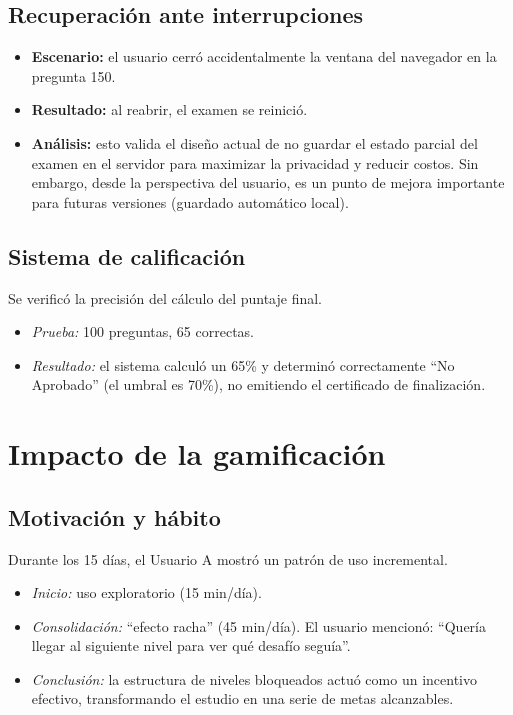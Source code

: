 \subsection{Recuperación ante interrupciones}
\begin{itemize}
\item   \textbf{Escenario:} el usuario cerró accidentalmente la ventana del navegador en la pregunta 150.
\item   \textbf{Resultado:} al reabrir, el examen se reinició.
\item   \textbf{Análisis:} esto valida el diseño actual de no guardar el estado parcial del examen en el servidor para maximizar la privacidad y reducir costos. Sin embargo, desde la perspectiva del usuario, es un punto de mejora importante para futuras versiones (guardado automático local).
\end{itemize}

\subsection{Sistema de calificación}
Se verificó la precisión del cálculo del puntaje final.
\begin{itemize}
\item   \textit{Prueba:} 100 preguntas, 65 correctas.
\item   \textit{Resultado:} el sistema calculó un 65\% y determinó correctamente \enquote{No Aprobado} (el umbral es 70\%), no emitiendo el certificado de finalización.
\end{itemize}

\section{Impacto de la gamificación}

\subsection{Motivación y hábito}
Durante los 15 días, el Usuario A mostró un patrón de uso incremental.
\begin{itemize}
\item   \textit{Inicio:} uso exploratorio (15 min/día).
\item   \textit{Consolidación:} \enquote{efecto racha} (45 min/día). El usuario mencionó: \enquote{Quería llegar al siguiente nivel para ver qué desafío seguía}.
\item   \textit{Conclusión:} la estructura de niveles bloqueados actuó como un incentivo efectivo, transformando el estudio en una serie de metas alcanzables.
\end{itemize}

